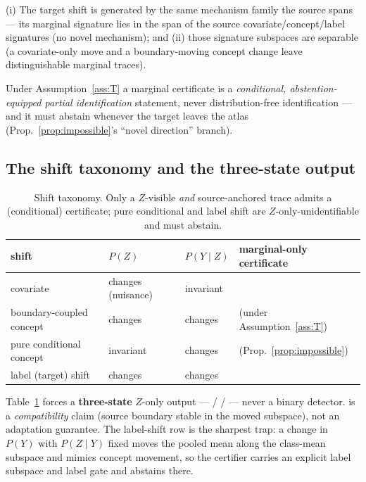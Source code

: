 \begin{assumption}
\label{ass:T}
(i) The target shift is generated by the same mechanism family the source spans --- its marginal signature
lies in the span of the source covariate/concept/label signatures (no novel mechanism); and (ii) those
signature subspaces are separable (a covariate-only move and a boundary-moving concept change leave
distinguishable marginal traces).
\end{assumption}

Under Assumption~\ref{ass:T} a marginal certificate is a \emph{conditional, abstention-equipped partial
identification} statement, never distribution-free identification --- and it must abstain whenever the
target leaves the atlas (Prop.~\ref{prop:impossible}'s ``novel direction'' branch).

\subsection{The shift taxonomy and the three-state output}

\begin{table}[t]
\centering
\caption{Shift taxonomy. Only a $Z$-visible \emph{and} source-anchored trace admits a (conditional)
certificate; pure conditional and label shift are $Z$-only-unidentifiable and must abstain.}
\label{tab:taxonomy}
\begin{tabular}{@{}llll@{}}
\toprule
shift & $P(Z)$ & $P(Y\mid Z)$ & marginal-only certificate \\
\midrule
covariate                 & changes (nuisance) & invariant & \stcov{} \\
boundary-coupled concept  & changes            & changes   & \stsus{} (under Assumption~\ref{ass:T}) \\
pure conditional concept  & invariant          & changes   & \stunid{} (Prop.~\ref{prop:impossible}) \\
label (target) shift      & changes            & changes   & \stunid{} \\
\bottomrule
\end{tabular}
\end{table}

Table~\ref{tab:taxonomy} forces a \textbf{three-state} $Z$-only output --- \stcov{} / \stsus{} / \stunid{}
--- never a binary detector. \stcov{} is a \emph{compatibility} claim (source boundary stable in the moved
subspace), not an adaptation guarantee. The label-shift row is the sharpest trap: a change in $P(Y)$ with
$P(Z\mid Y)$ fixed moves the pooled mean along the class-mean subspace and mimics concept movement, so the
certifier carries an explicit label subspace and label gate and abstains there.

